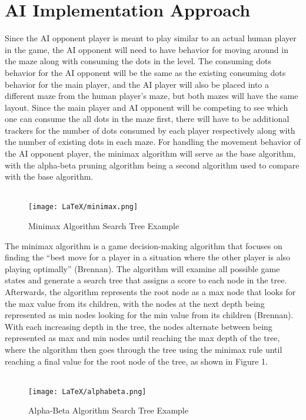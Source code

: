 \documentclass[letterpaper]{article} %
\begin{document}
\section{AI Implementation Approach}
Since the AI opponent player is meant to play similar to an actual human player in the game, the AI opponent will need to have behavior for moving around in the maze along with consuming the dots in the level. The consuming dots behavior for the AI opponent will be the same as the existing consuming dots behavior for the main player, and the AI player will also be placed into a different maze from the human player’s maze, but both mazes will have the same layout. Since the main player and AI opponent will be competing to see which one can consume the all dots in the maze first, there will have to be additional trackers for the number of dots consumed by each player respectively along with the number of existing dots in each maze. For handling the movement behavior of the AI opponent player, the minimax algorithm will serve as the base algorithm, with the alpha-beta pruning algorithm being a second algorithm used to compare with the base algorithm.
\\ \\
\begin{figure}[H]
    \centering
    \texttt{[image: LaTeX/minimax.png]}
    \caption{Minimax Algorithm Search Tree Example}
    \label{fig:enter-label}
\end{figure}
The minimax algorithm is a game decision-making algorithm that focuses on finding the “best move for a player in a situation where the other player is also playing optimally” (Brennan). The algorithm will examine all possible game states and generate a search tree that assigns a score to each node in the tree. Afterwards, the algorithm represents the root node as a max node that looks for the max value from its children, with the nodes at the next depth being represented as min nodes looking for the min value from its children (Brennan). With each increasing depth in the tree, the nodes alternate between being represented as max and min nodes until reaching the max depth of the tree, where the algorithm then goes through the tree using the minimax rule until reaching a final value for the root node of the tree, as shown in Figure 1. 
\\ \\
\begin{figure}[H]
    \centering
    \texttt{[image: LaTeX/alphabeta.png]}
    \caption{Alpha-Beta Algorithm Search Tree Example}
    \label{fig:enter-label}
\end{figure}
\end{document}
